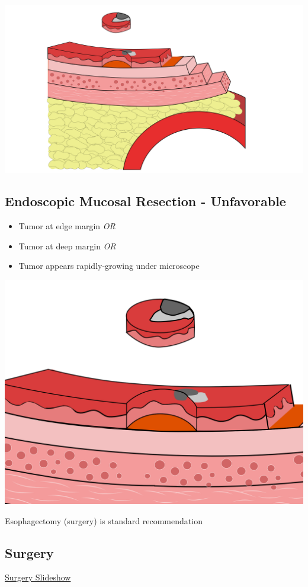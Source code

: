 \documentclass[
  letterpaper,
  DIV=11,
  numbers=noendperiod]{scrartcl}
\providecommand{\tightlist}{%
  \setlength{\itemsep}{0pt}\setlength{\parskip}{0pt}}\usepackage{longtable,booktabs,array}
\begin{document}
\includegraphics{christmas2004_files/mediabag/emr_unfavorable.png}

\subsection{Endoscopic Mucosal Resection -
Unfavorable}\label{endoscopic-mucosal-resection---unfavorable-1}

\begin{itemize}
\tightlist
\item
  Tumor at edge margin \emph{OR}
\item
  Tumor at deep margin \emph{OR}
\item
  Tumor appears rapidly-growing under microscope
\end{itemize}

\includegraphics{christmas2004_files/mediabag/emr_unfavorable_1600.png}

Esophagectomy (surgery) is standard recommendation

\subsection{Surgery}\label{surgery}

\href{lci_surgery.htm}{Surgery Slideshow}
\end{document}
